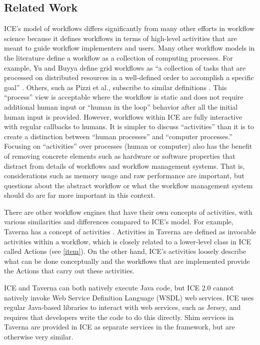 \subsection{Related Work}\label{comparison-to-other-models}

ICE's model of workflows differs significantly from many other
efforts in workflow science because it defines workflows in terms of high-level activities that are meant to guide workflow implementers and users. Many other workflow models in the literature define a workflow as
a collection of computing processes. For example, Yu and Buyya define
grid workflows as ``a collection of tasks that are processed on
distributed resources in a well-defined order to accomplish a specific
goal'' \cite{yu_taxonomy_2005}. Others, such as Pizzi et al., subscribe to
similar definitions \cite{pizzi_aiida:_2016}. This ``process'' view is
acceptable where the workflow is static and does not require additional
human input or ``human in the loop'' behavior after all the initial
human input is provided. However, workflows within ICE are fully interactive with regular callbacks to humans. It is simpler to discuss ``activities'' than it is to create a distinction between ``human processes'' and ``computer processes.''
Focusing on ``activities'' over processes (human or computer) also has
the benefit of removing concrete elements such as hardware or software properties that distract from details of workflows and workflow 
management systems. That is, considerations such as memory usage and 
raw performance are important, but questions about the abstract workflow 
or what the workflow management system should do are far more important in this context.

There are other workflow engines that have their own concepts of activities, with various similarities and differences compared to ICE's model. For example, Taverna has a concept of activities \cite{wolstencroft_taverna_2013}. Activities in Taverna are defined as invocable activities within a workflow, which is closely related to a lower-level class in ICE called Actions (see \ref{item}). On the other hand, ICE's activities loosely describe what can be done conceptually and the workflows that are implemented provide the Actions that carry out these activities. 

ICE and Taverna can both natively execute Java code, but ICE 2.0 cannot natively invoke Web Service Definition Language (WSDL) web services. ICE uses regular Java-based libraries to interact with web services, such as Jersey, and requires that developers write the code to do this directly. Shim services in Taverna are provided in ICE as separate services in the framework, but are otherwise very similar.

